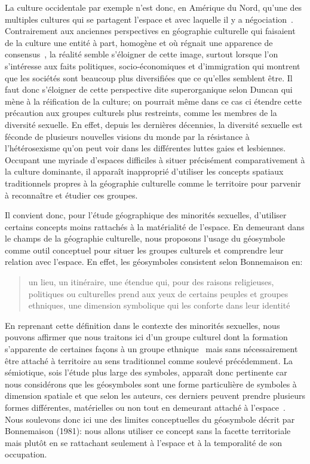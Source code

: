 La culture occidentale par exemple n'est donc, en Amérique du Nord, qu'une des multiples cultures qui se partagent l'espace et avec laquelle il y a négociation~\citep[11]{Duncan1993}. 
Contrairement aux anciennes perspectives en géographie culturelle qui faisaient de la culture une entité à part, homogène et où régnait une apparence de consensus~\citep{Duncan1980}, la réalité semble s'éloigner de cette image, surtout lorsque l'on s'intéresse aux faits politiques, socio-économiques et d'immigration qui montrent que les sociétés sont beaucoup plus diversifiées que ce qu'elles semblent être. 
Il faut donc s'éloigner de cette perspective dite superorganique selon Duncan qui mène à la réification de la culture; on pourrait même dans ce cas ci étendre cette précaution aux groupes culturels plus restreints, comme les membres de la diversité sexuelle. 
En effet, depuis les dernières décennies, la diversité sexuelle est féconde de plusieurs nouvelles visions du monde par la résistance à l'hétérosexisme qu'on peut voir dans les différentes luttes gaies et lesbiennes.
Occupant une myriade d'espaces difficiles à situer précisément comparativement à la culture dominante, il apparaît inapproprié d'utiliser les concepts spatiaux traditionnels propres à la géographie culturelle comme le territoire pour parvenir à reconnaître et étudier ces groupes.

Il convient donc, pour l'étude géographique des minorités sexuelles, d'utiliser certains concepts moins rattachés à la matérialité de l'espace. 
En demeurant dans le champs de la géographie culturelle, nous proposons l'usage du géosymbole comme outil conceptuel pour situer les groupes culturels et comprendre leur relation avec l'espace. 
En effet, les géosymboles consistent selon Bonnemaison en: \blockquote[{\cite[256]{Bonnemaison1981}}][.]{\textelp{} un lieu, un   itinéraire, une étendue qui, pour des raisons religieuses, politiques ou   culturelles prend aux yeux de certains peuples et groupes ethniques, une   dimension symbolique qui les conforte dans leur identité }. 
En reprenant cette définition dans le contexte des minorités sexuelles, nous pouvons affirmer que nous traitons ici d'un groupe culturel dont la formation s'apparente de certaines façons à un groupe ethnique~\citep{Sinfield1996} mais sans nécessairement être attaché à territoire au sens traditionnel comme soulevé précédemment. 
La sémiotique, sois l'étude plus large des symboles, apparaît donc pertinente car nous considérons que les géosymboles sont une forme particulière de symboles à dimension spatiale et que selon les auteurs, ces derniers peuvent prendre plusieurs formes différentes, matérielles ou non tout en demeurant attaché à l'espace~\citep{Bonnemaison1981,Bedard2002}. 
Nous soulevons donc ici une des limites conceptuelles du géosymbole décrit par Bonnemaison (1981): nous allons utiliser ce concept sans la facette territoriale mais plutôt en se rattachant seulement à l'espace et à la temporalité de son occupation.

